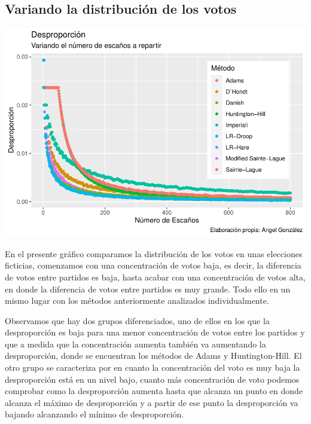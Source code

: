 \documentclass[12pt,a4paper,]{book}
\numberwithin{dummy}{section}
\theoremstyle{ocrenumbox}
\theoremstyle{blacknumex}
\theoremstyle{blacknumbox}
\theoremstyle{ocrenum}
\theoremstyle{ocrenum}
\begin{document}
\hypertarget{variando-la-distribuciuxf3n-de-los-votos}{%
\subsection{Variando la distribución de los
votos}\label{variando-la-distribuciuxf3n-de-los-votos}}

\begin{center}\includegraphics[width=0.95\linewidth]{figurasR/unnamed-chunk-49-1} \end{center}

En el presente gráfico comparamos la distribución de los votos en unas
elecciones ficticias, comenzamos con una concentración de votos baja, es
decir, la diferencia de votos entre partidos es baja, hasta acabar con
una concentración de votos alta, en donde la diferencia de votos entre
partidos es muy grande. Todo ello en un mismo lugar con los métodos
anteriormente analizados individualmente.

Observamos que hay dos grupos diferenciados, uno de ellos en los que la
desproporción es baja para una menor concentración de votos entre los
partidos y que a medida que la concentración aumenta también va
aumentando la desproporción, donde se encuentran los métodos de Adams y
Huntington-Hill. El otro grupo se caracteriza por en cuanto la
concentración del voto es muy baja la desproporción está en un nivel
bajo, cuanto más concentración de voto podemos comprobar como la
desproporción aumenta hasta que alcanza un punto en donde alcanza el
máximo de desproporción y a partir de ese punto la desproporción va
bajando alcanzando el mínimo de desproporción.
\end{document}

